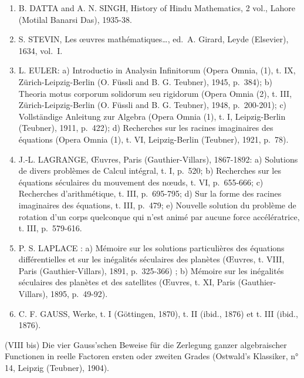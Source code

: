 \begin{enumerate}
\def\labelenumi{(\Roman{enumi})}
\setcounter{enumi}{2}
\item
  B. DATTA and A. N. SINGH, History of Hindu Mathematics, 2 vol., Lahore (Motilal Banarsi Das), 1935-38.
\item
  S. STEVIN, Les œuvres mathématiques\ldots, ed.~A. Girard, Leyde (Elsevier), 1634, vol.~I.
\item
  L. EULER: a) Introductio in Analysin Infinitorum (Opera Omnia, (1), t. IX, Zürich-Leipzig-Berlin (O. Füssli and B. G. Teubner), 1945, p.~384); b) Theoria motus corporum solidorum seu rigidorum (Opera Omnia (2), t. III, Zürich-Leipzig-Berlin (O. Füssli and B. G. Teubner), 1948, p.~200-201); c) Vollständige Anleitung zur Algebra (Opera Omnia (1), t. I, Leipzig-Berlin (Teubner), 1911, p.~422); d) Recherches sur les racines imaginaires des équations (Opera Omnia (1), t. VI, Leipzig-Berlin (Teubner), 1921, p.~78).
\item
  J.-L. LAGRANGE, Œuvres, Paris (Gauthier-Villars), 1867-1892: a) Solutions de divers problèmes de Calcul intégral, t. I, p.~520; b) Recherches sur les équations séculaires du mouvement des nœuds, t. VI, p.~655-666; c) Recherches d'arithmétique, t. III, p.~695-795; d) Sur la forme des racines imaginaires des équations, t. III, p.~479; e) Nouvelle solution du problème de rotation d'un corps quelconque qui n'est animé par aucune force accélératrice, t. III, p.~579-616.
\item
  P. S. LAPLACE : a) Mémoire sur les solutions particulières des équations différentielles et sur les inégalités séculaires des planètes (Œuvres, t. VIII, Paris (Gauthier-Villars), 1891, p.~325-366) ; b) Mémoire sur les inégalités séculaires des planètes et des satellites (Œuvres, t. XI, Paris (Gauthier-Villars), 1895, p.~49-92).
\item
  C. F. GAUSS, Werke, t. I (Göttingen, 1870), t. II (ibid., 1876) et t. III (ibid., 1876).
\end{enumerate}

(VIII bis) Die vier Gauss'schen Beweise für die Zerlegung ganzer algebraischer Functionen in reelle Factoren ersten oder zweiten Grades (Ostwald's Klassiker, n° 14, Leipzig (Teubner), 1904).

